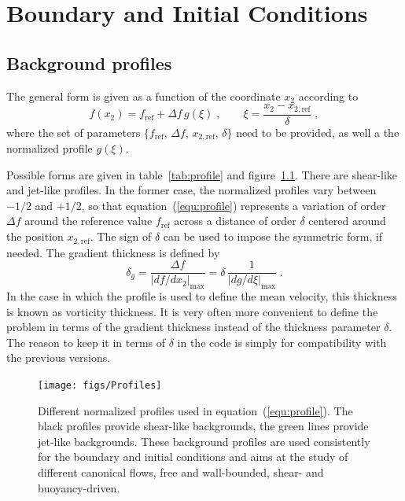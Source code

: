 \chapter{Boundary and Initial Conditions}\label{sec:bcs}

\section{Background profiles}

The general form is given as a function of the coordinate $x_2$ according to
\begin{equation}
  f(x_2) = f_\text{ref}+\Delta f\, g(\xi) \;,\qquad
  \xi=\frac{x_2-x_{2,\text{ref}}}{\delta} \;,
\label{equ:profile}
\end{equation}
where the set of parameters $\{f_\text{ref},\,\Delta
f,\,x_{2,\text{ref}},\,\delta\}$ need to be provided, as well a the normalized
profile $g(\xi)$.

Possible forms are given in table~\ref{tab:profile} and
figure~\ref{fig:profile}. There are shear-like and jet-like profiles. In the
former case, the normalized profiles vary between $-1/2$ and $+1/2$, so that
equation~(\ref{equ:profile}) represents a variation of order $\Delta f$ around
the reference value $f_\text{ref}$ across a distance of order $\delta$ centered
around the position $x_{2,\text{ref}}$. The sign of $\delta$ can be used to
impose the symmetric form, if needed. The gradient thickness is defined by
\begin{equation}
  \delta_g =\frac{\Delta f}{|d f/d x_2|_\text{max}} =
  \delta\,\frac{1}{|d g/d \xi|_\text{max}} \;.
\label{equ:deltag}
\end{equation}
In the case in which the profile is used to define the mean velocity, this
thickness is known as vorticity thickness.  It is very often more convenient to
define the problem in terms of the gradient thickness instead of the thickness
parameter $\delta$. The reason to keep it in terms of $\delta$ in the code is
simply for compatibility with the previous versions.

\begin{figure}
\texttt{[image: figs/Profiles]}
\caption{Different normalized profiles used in equation~(\ref{equ:profile}). The
  black profiles provide shear-like backgrounds, the green lines provide
  jet-like backgrounds. These background profiles are used consistently for the
  boundary and initial conditions and aims at the study of different canonical
  flows, free and wall-bounded, shear- and buoyancy-driven.}\label{fig:profile}
\end{figure}

